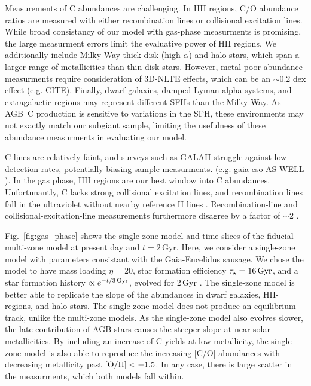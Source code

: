 \documentclass[fleqn,
usenatbib]{mnras}
\newcommand{\agb}{AGB}
\newcommand{\sfh}{SFH} %
\newcommand{\about}[1]{${\sim} #1$}
\begin{document}
Measurements of C abundances are challenging. 
In HII regions, C/O abundance ratios are measured with either recombination lines or collisional excitation lines. While broad consistancy of our model with gas-phase measurments is promising, the large measurment errors limit the evaluative power of HII regions.
We additionally include Milky Way thick disk (high-$\alpha$) and halo stars, which span a larger range of metallicities than thin disk stars. However, metal-poor abundance measurments require consideration of 3D-NLTE effects, which can be an \about{0.2} dex effect  (e.g. CITE). 
Finally, dwarf galaxies, damped Lyman-alpha systems, and extragalactic regions may represent different \sfh{}s than the Milky Way.
As \agb\ C production is sensitive to variations in the \sfh, these environments may not exactly match our subgiant sample, limiting the usefulness of these abundance measurments in evaluating our model.

C lines are relatively faint, and surveys such as GALAH struggle against low detection rates, potentially biasing sample measurments. 
(e.g. gaia-eso AS WELL \citealt{franchini+20}).
In the gas phase, HII regions are our best window into C abundances. Unfortunantly, C lacks strong collisional excitation lines, and recombination lines fall in the ultraviolet without nearby reference H lines \citep{skillman+20}. Recombination-line and collisional-excitation-line measurements furthermore disagree by a factor of \about{2} \citep{GR07}. 



Fig.~\ref{fig:gas_phase} shows the single-zone model and time-slices of the fiducial multi-zone model at present day and $t=2$\,Gyr. 
Here, we consider a single-zone model with parameters consistant with the Gaia-Encelidus sausage\footnotemark{}. We chose the model to have mass loading $\eta=20$, star formation efficiency $\tau_{\star}=16\,{\rm Gyr}$, and a star formation history $\propto e^{-t/3{\rm\,Gyr}}$, evolved for 2\,Gyr \citep{james_dwarf}.
The single-zone model is better able to replicate the slope of the abundances in dwarf galaxies, HII-regions, and halo stars. The single-zone model does not produce an equilibrium track, unlike the multi-zone models. As the single-zone model also evolves slower, the late contribution of AGB stars causes the steeper slope at near-solar metallicities. By including an increase of C yields at low-metallicity, the single-zone model is also able to reproduce the increasing [C/O] abundances with decreasing metallicity past ${\rm [O/H]} < -1.5$. In any case, there is large scatter in the measurments, which both models fall within.
\end{document}
